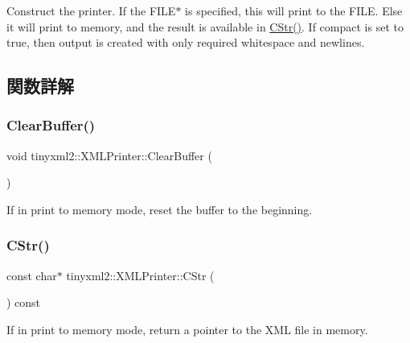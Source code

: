 Construct the printer. If the F\+I\+L\+E$\ast$ is specified, this will print to the F\+I\+LE. Else it will print to memory, and the result is available in \hyperlink{classtinyxml2_1_1_x_m_l_printer_a180671d73844f159f2d4aafbc11d106e}{C\+Str()}. If \textquotesingle{}compact\textquotesingle{} is set to true, then output is created with only required whitespace and newlines. 

\subsection{関数詳解}
\mbox{\label{classtinyxml2_1_1_x_m_l_printer_a216157765b7267bf389975b1cbf9a909}} 
\subsubsection{\texorpdfstring{Clear\+Buffer()}{ClearBuffer()}}
{\footnotesize\ttfamily void tinyxml2\+::\+X\+M\+L\+Printer\+::\+Clear\+Buffer (\begin{DoxyParamCaption}{ }\end{DoxyParamCaption})\hspace{0.3cm}{\ttfamily [inline]}}

If in print to memory mode, reset the buffer to the beginning. \mbox{\label{classtinyxml2_1_1_x_m_l_printer_a180671d73844f159f2d4aafbc11d106e}} 
\subsubsection{\texorpdfstring{C\+Str()}{CStr()}}
{\footnotesize\ttfamily const char$\ast$ tinyxml2\+::\+X\+M\+L\+Printer\+::\+C\+Str (\begin{DoxyParamCaption}{ }\end{DoxyParamCaption}) const\hspace{0.3cm}{\ttfamily [inline]}}

If in print to memory mode, return a pointer to the X\+ML file in memory. \mbox{\label{classtinyxml2_1_1_x_m_l_printer_a3256cf3523d4898b91abb18b924be04c}} 
